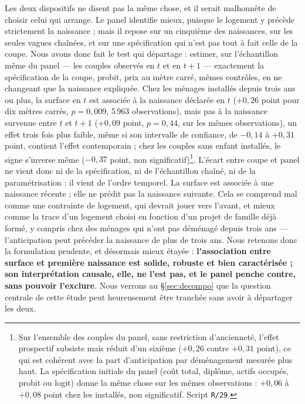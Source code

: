 \documentclass[12pt,a4paper]{article}
\begin{document}
\noindent Les deux dispositifs ne disent pas la même chose, et il serait malhonnête de choisir celui qui arrange. Le panel identifie mieux, puisque le logement y précède strictement la naissance ; mais il repose sur un cinquième des naissances, sur les seules vagues chaînées, et sur une spécification qui n'est pas tout à fait celle de la coupe. Nous avons donc fait le test qui départage : estimer, sur l'échantillon même du panel — les couples observés en $t$ et en $t+1$ — exactement la spécification de la coupe, probit, prix au mètre carré, mêmes contrôles, en ne changeant que la naissance expliquée. Chez les ménages installés depuis trois ans ou plus, la surface en $t$ est associée à la naissance déclarée en $t$ ($+0{,}26$ point pour dix mètres carrés, $p = 0{,}009$, 5\,963 observations), mais pas à la naissance survenue entre $t$ et $t+1$ ($+0{,}09$ point, $p = 0{,}44$, sur les mêmes observations), un effet trois fois plus faible, même si son intervalle de confiance, de $-0{,}14$ à $+0{,}31$ point, contient l'effet contemporain ; chez les couples sans enfant installés, le signe s'inverse même ($-0{,}37$ point, non significatif)\footnote{Sur l'ensemble des couples du panel, sans restriction d'ancienneté, l'effet prospectif subsiste mais réduit d'un sixième ($+0{,}26$ contre $+0{,}31$ point), ce qui est cohérent avec la part d'anticipation par déménagement mesurée plus haut. La spécification initiale du panel (coût total, diplôme, actifs occupés, probit ou logit) donne la même chose sur les mêmes observations : $+0{,}06$ à $+0{,}08$ point chez les installés, non significatif. Script \texttt{R/29}.}. L'écart entre coupe et panel ne vient donc ni de la spécification, ni de l'échantillon chaîné, ni de la paramétrisation : il vient de l'ordre temporel. La surface est associée à une naissance récente ; elle ne prédit pas la naissance suivante. Cela se comprend mal comme une contrainte de logement, qui devrait jouer vers l'avant, et mieux comme la trace d'un logement choisi en fonction d'un projet de famille déjà formé, y compris chez des ménages qui n'ont pas déménagé depuis trois ans — l'anticipation peut précéder la naissance de plus de trois ans. Nous retenons donc la formulation prudente, et désormais mieux étayée : \textbf{l'association entre surface et première naissance est solide, robuste et bien caractérisée ; son interprétation causale, elle, ne l'est pas, et le panel penche contre, sans pouvoir l'exclure}. Nous verrons au §\ref{sec:decompo} que la question centrale de cette étude peut heureusement être tranchée sans avoir à départager les deux. \\
\end{document}
